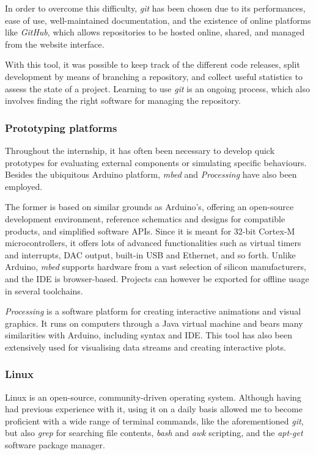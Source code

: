 In order to overcome this difficulty, \emph{git} has been chosen due to its performances, ease of use, well-maintained documentation, and the existence of online platforms like \emph{GitHub}, which allows repositories to be hosted online, shared, and managed from the website interface.

With this tool, it was possible to keep track of the different code releases, split development by means of branching a repository, and collect useful statistics to assess the state of a project.
Learning to use \emph{git} is an ongoing process, which also involves finding the right software for managing the repository.


\subsubsection{Prototyping platforms}
Throughout the internship, it has often been necessary to develop quick prototypes for evaluating external components or simulating specific behaviours.
Besides the ubiquitous Arduino platform, \emph{mbed} and \emph{Processing} have also been employed.

The former is based on similar grounds as Arduino's, offering an open-source development environment, reference schematics and designs for compatible products, and simplified software APIs.
Since it is meant for 32-bit Cortex-M microcontrollers, it offers lots of advanced functionalities such as virtual timers and interrupts, DAC output, built-in USB and Ethernet, and so forth.
Unlike Arduino, \emph{mbed} supports hardware from a vast selection of silicon manufacturers, and the IDE is browser-based.
Projects can however be exported for offline usage in several toolchains.

\emph{Processing} is a software platform for creating interactive animations and visual graphics.
It runs on computers through a Java virtual machine and bears many similarities with Arduino, including syntax and IDE.
This tool has also been extensively used for visualising data streams and creating interactive plots.


\subsubsection{Linux}
Linux is an open-source, community-driven operating system.
Although having had previous experience with it, using it on a daily basis allowed me to become proficient with a wide range of terminal commands, like the aforementioned \emph{git}, but also \emph{grep} for searching file contents, \emph{bash} and \emph{awk} scripting, and the \emph{apt-get} software package manager.


